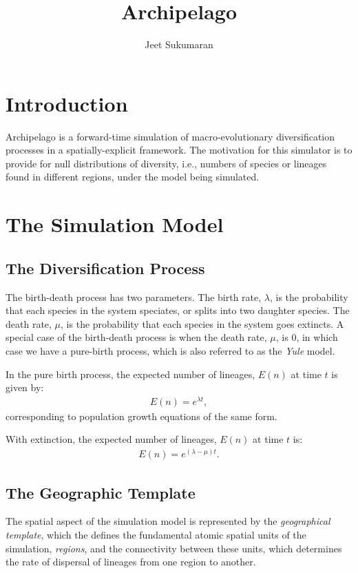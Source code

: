\documentclass[11pt]{article}
\title{Archipelago}
\author{Jeet Sukumaran}
\begin{document}
\maketitle
\section*{Introduction}
Archipelago is a forward-time simulation of macro-evolutionary diversification processes in a spatially-explicit framework.
The motivation for this simulator is to provide for null distributions of diversity, i.e., numbers of species or lineages found in different regions, under the model being simulated.

\section*{The Simulation Model}

\subsection*{The Diversification Process}
The birth-death process has two parameters.
The birth rate, $\lambda$, is the probability that each species in the system speciates, or splits into two daughter species.
The death rate, $\mu$, is the probability that each species in the system goes extincts.
A special case of the birth-death process is when the death rate, $\mu$, is 0, in which case we have a pure-birth process, which is also referred to as the \textit{Yule} model.

In the pure birth process, the expected number of lineages, $E(n)$ at time $t$ is given by:
\begin{align*}
E(n) = e^{\lambda t},
\end{align*}
corresponding to population growth equations of the same form.

With extinction, the expected number of lineages, $E(n)$ at time $t$ is:
\begin{align*}
E(n) = e^{(\lambda-\mu) t}.
\end{align*}

\subsection*{The Geographic Template}

The spatial aspect of the simulation model is represented by the \textit{geographical template}, which the defines the fundamental atomic spatial units of the simulation, \textit{regions}, and the connectivity between these units, which determines the rate of dispersal of lineages from one region to another.





\end{document}
